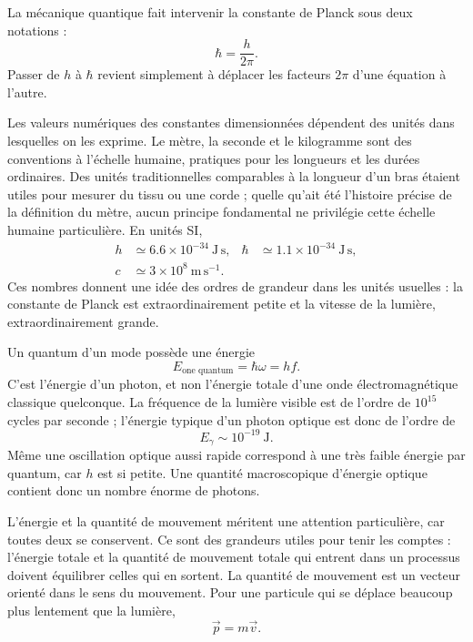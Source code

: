 La mécanique quantique fait intervenir la constante de Planck sous deux notations :
\begin{equation}
\hbar=\frac{h}{2\pi}.
\end{equation}
Passer de \(h\) à \(\hbar\) revient simplement à déplacer les facteurs \(2\pi\) d’une équation à l’autre.

Les valeurs numériques des constantes dimensionnées dépendent des unités dans lesquelles on les exprime. Le mètre, la seconde et le kilogramme sont des conventions à l’échelle humaine, pratiques pour les longueurs et les durées ordinaires. Des unités traditionnelles comparables à la longueur d’un bras étaient utiles pour mesurer du tissu ou une corde ; quelle qu’ait été l’histoire précise de la définition du mètre, aucun principe fondamental ne privilégie cette échelle humaine particulière. En unités SI,
\begin{equation}
\begin{aligned}
h &\simeq 6.6\times10^{-34}\ \mathrm{J\,s},
&\hbar &\simeq 1.1\times10^{-34}\ \mathrm{J\,s},\\
c &\simeq 3\times10^8\ \mathrm{m\,s^{-1}}.
\end{aligned}
\end{equation}
Ces nombres donnent une idée des ordres de grandeur dans les unités usuelles : la constante de Planck est extraordinairement petite et la vitesse de la lumière, extraordinairement grande.

Un quantum d’un mode possède une énergie
\begin{equation}
E_{\text{one quantum}}=\hbar\omega=hf.
\end{equation}
C’est l’énergie d’un photon, et non l’énergie totale d’une onde électromagnétique classique quelconque. La fréquence de la lumière visible est de l’ordre de \(10^{15}\) cycles par seconde ; l’énergie typique d’un photon optique est donc de l’ordre de
\begin{equation}
E_\gamma\sim 10^{-19}\ \mathrm{J}.
\end{equation}
Même une oscillation optique aussi rapide correspond à une très faible énergie par quantum, car \(h\) est si petite. Une quantité macroscopique d’énergie optique contient donc un nombre énorme de photons.

L’énergie et la quantité de mouvement méritent une attention particulière, car toutes deux se conservent. Ce sont des grandeurs utiles pour tenir les comptes : l’énergie totale et la quantité de mouvement totale qui entrent dans un processus doivent équilibrer celles qui en sortent. La quantité de mouvement est un vecteur orienté dans le sens du mouvement. Pour une particule qui se déplace beaucoup plus lentement que la lumière,
\begin{equation}
\vec p=m\vec v.
\end{equation}

